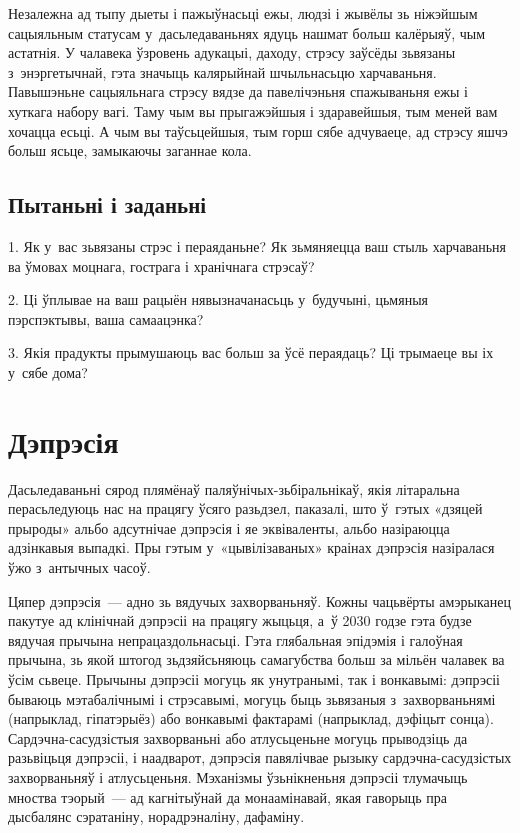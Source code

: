Незалежна ад тыпу дыеты і пажыўнасьці ежы, людзі і жывёлы зь ніжэйшым сацыяльным статусам у~дасьледаваньнях ядуць нашмат больш калёрыяў, чым астатнія. У чалавека ўзровень адукацыі, даходу, стрэсу заўсёды зьвязаны з~энэргетычнай, гэта значыць калярыйнай шчыльнасьцю харчаваньня. Павышэньне сацыяльнага стрэсу вядзе да павелічэньня спажываньня ежы і хуткага набору вагі. Таму чым вы прыгажэйшыя і здаравейшыя, тым меней вам хочацца есьці. А чым вы таўсьцейшыя, тым горш сябе адчуваеце, ад стрэсу яшчэ больш ясьце, замыкаючы заганнае кола.

\subsection*{Пытаньні і заданьні}

1. Як у~вас зьвязаны стрэс і пераяданьне? Як зьмяняецца ваш стыль харчаваньня ва ўмовах моцнага, гострага і хранічнага стрэсаў?

2. Ці ўплывае на ваш рацыён нявызначанасьць у~будучыні, цьмяныя пэрспэктывы, ваша самаацэнка?

3. Якія прадукты прымушаюць вас больш за ўсё пераядаць? Ці трымаеце вы іх у~сябе дома?


\section{Дэпрэсія}

Дасьледаваньні сярод плямёнаў паляў\-ні\-чых-зьбіральнікаў, якія літаральна перасьледуюць нас на працягу ўсяго разьдзел, паказалі, што ў~гэтых «дзяцей прыроды» альбо адсутнічае дэпрэсія і яе эквіваленты, альбо назіраюцца адзінкавыя выпадкі. Пры гэтым у~«цывілізаваных» краінах дэпрэсія назіралася ўжо з~антычных часоў. 


Цяпер дэпрэсія~--- адно зь вядучых захворваньняў. Кожны чацьвёрты амэрыканец пакутуе ад клінічнай дэпрэсіі на працягу жыцьця, а~ў 2030 годзе гэта будзе вядучая прычына непрацаздольнасьці. Гэта глябальная эпідэмія і галоўная прычына, зь якой штогод зьдзяйсьняюць самагубства больш за мільён чалавек ва ўсім сьвеце. Прычыны дэпрэсіі могуць як унутранымі, так і вонкавымі: дэпрэсіі бываюць мэтабалічнымі і стрэсавымі, могуць быць зьвязаныя з~захворваньнямі (напрыклад, гіпатэрыёз) або вонкавымі фактарамі (напрыклад, дэфіцыт сонца). Сардэчна-сасудзістыя захворваньні або атлусьценьне могуць прыводзіць да разьвіцьця дэпрэсіі, і наадварот, дэпрэсія павялічвае рызыку сардэчна-сасудзістых захворваньняў і атлусьценьня. Мэханізмы ўзьнікненьня дэпрэсіі тлумачыць мноства тэорый~--- ад кагнітыўнай да монаамінавай, якая гаворыць пра дысбалянс сэратаніну, норадрэналіну, дафаміну.

